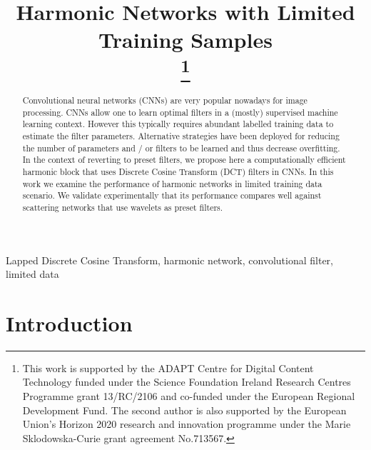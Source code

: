 \documentclass[conference]{IEEEtran}
\begin{document}
\title{Harmonic Networks with Limited Training Samples \\
\thanks{This work is supported by the ADAPT Centre for Digital Content Technology funded under the Science Foundation Ireland Research Centres Programme grant 13/RC/2106 and co-funded under the European Regional Development Fund. The second author is also supported by the European Union’s Horizon 2020 research and innovation programme under the Marie Sklodowska-Curie grant agreement No.713567.}
}

\author{
}

\maketitle

\begin{abstract}
Convolutional neural networks (CNNs) are very popular nowadays for image processing. CNNs allow one to learn optimal filters in a (mostly) supervised machine learning context. However this typically requires abundant labelled training data to estimate the filter parameters. Alternative strategies have been deployed for reducing the number of parameters and / or filters to be learned and thus decrease overfitting. In the context of reverting to preset filters, we propose here a computationally efficient harmonic block that uses Discrete Cosine Transform (DCT) filters in CNNs. In this work we examine the performance of harmonic networks in limited training data scenario. We validate experimentally that its performance compares well against scattering networks that use wavelets as preset filters.
\end{abstract}

\begin{IEEEkeywords}
Lapped Discrete Cosine Transform, harmonic network, convolutional filter, limited data
\end{IEEEkeywords}

\section{Introduction} 
\label{sec:intro}
\end{document}
